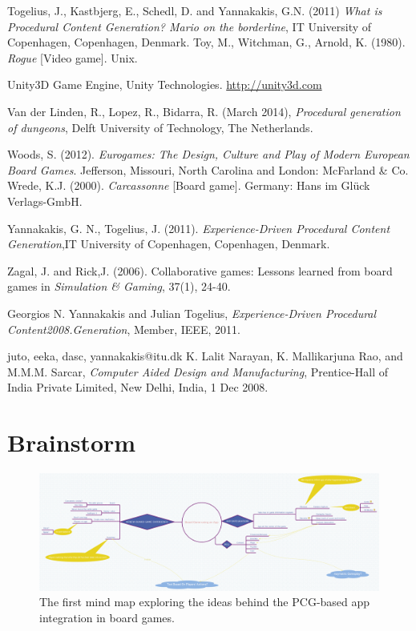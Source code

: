 \documentclass[a4paper,11pt]{report}
\begin{document}
\begin{thebibliography}{1}
Togelius, J., Kastbjerg, E., Schedl, D. and Yannakakis, G.N. (2011) \emph{What is Procedural Content Generation? Mario on the borderline}, IT University of Copenhagen, Copenhagen, Denmark.
Toy, M., Witchman, G., Arnold, K. (1980). \textit{Rogue} [Video game]. Unix.

Unity3D Game Engine, Unity Technologies.
\url{http://unity3d.com}

Van der Linden, R., Lopez, R., Bidarra, R. (March 2014), \textit{Procedural generation of dungeons}, Delft University of Technology, The Netherlands.

Woods, S. (2012). \textit{Eurogames: The Design, Culture and Play of Modern European Board Games}. Jefferson, Missouri, North Carolina and London: McFarland \& Co.
Wrede, K.J. (2000). \textit{Carcassonne} [Board game]. Germany: Hans im Glück Verlags-GmbH.

Yannakakis, G. N., Togelius, J. (2011). \textit{Experience-Driven Procedural Content Generation},IT University of Copenhagen, Copenhagen, Denmark.

Zagal, J. and Rick,J. (2006). Collaborative games: Lessons learned from board games in \textit{Simulation \& Gaming}, 37(1), 24-40.

Georgios N. Yannakakis and Julian Togelius, \emph{Experience-Driven Procedural Content2008.Generation}, Member, IEEE, 2011.

{juto, eeka, dasc, yannakakis}@itu.dk
K. Lalit Narayan, K. Mallikarjuna Rao, and M.M.M. Sarcar, \emph{Computer Aided Design and Manufacturing}, Prentice-Hall of India Private Limited, New Delhi, India, 1 Dec 2008.

\end{thebibliography}
\pagebreak
\appendix
\chapter{Brainstorm}
\begin{figure}[h]
    \centering
    \includegraphics[scale=0.18,angle=-90]{Images/Brainstorm1.png}
    \caption{The first mind map exploring the ideas behind the PCG-based app integration in board games.}
    \label{fig:brainstorm1}
\end{figure}
\end{document}

